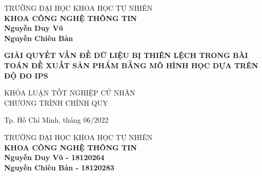 \begin{titlepage}

\begin{center}
TRƯỜNG ĐẠI HỌC KHOA HỌC TỰ NHIÊN\\
\textbf{KHOA CÔNG NGHỆ THÔNG TIN}\\[2cm]


{ \Large \bfseries Nguyễn Duy Vũ\\} 
{ \Large \bfseries Nguyễn Chiêu Bản\\[2cm] } 


{ \Large \bfseries GIẢI QUYẾT VẤN ĐỀ DỮ LIỆU BỊ THIÊN LỆCH TRONG BÀI TOÁN ĐỀ XUẤT SẢN PHẨM BẰNG MÔ HÌNH HỌC DỰA TRÊN ĐỘ ĐO IPS\\[3cm]} 


\large KHÓA LUẬN TỐT NGHIỆP CỬ NHÂN\\
\large CHƯƠNG TRÌNH CHÍNH QUY\\



\vfill
Tp. Hồ Chí Minh, tháng 06/2022

\end{center}

\pagebreak



\begin{center}

TRƯỜNG ĐẠI HỌC KHOA HỌC TỰ NHIÊN\\
\textbf{KHOA CÔNG NGHỆ THÔNG TIN}\\[2cm]


{\large \bfseries Nguyễn Duy Vũ - 18120264\\} 
{\large \bfseries Nguyễn Chiêu Bản - 18120283\\[2cm]} 



\end{center}
\end{titlepage}
